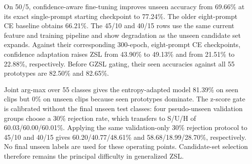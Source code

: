 \documentclass[conference]{IEEEtran}
\begin{document}
\begin{table}[t]
\centering
\caption{Zero-shot action recognition in prior publications and our ETRI
evaluation. Datasets and class draws differ across rows, so the numbers
provide context rather than a direct ranking.}
\label{tab:context}
\scriptsize
{}
\end{table}

On 50/5, confidence-aware fine-tuning improves unseen accuracy from 69.66\% at
its exact single-prompt starting checkpoint to 77.24\%. The older eight-prompt
CE baseline obtains 66.21\%. The 45/10 and 40/15 rows use the same current
feature and training pipeline and show degradation as the unseen candidate set
expands. Against their corresponding 300-epoch, eight-prompt CE checkpoints,
confidence adaptation raises ZSL from 43.90\% to 49.13\% and from 21.51\% to
22.88\%, respectively. Before GZSL gating, their seen accuracies against all 55
prototypes are 82.50\% and 82.65\%.

Joint arg-max over 55 classes gives the entropy-adapted model 81.39\% on seen clips but
0\% on unseen clips because seen prototypes dominate. The z-score gate is
calibrated without the final unseen test classes: four pseudo-unseen validation
groups choose a 30\% rejection rate, which transfers to S/U/H of
60.03/60.00/60.01\%. Applying the same validation-only 30\% rejection protocol
to 45/10 and 40/15 gives 60.20/40.77/48.61\% and 58.68/18.99/28.70\%,
respectively. No final unseen labels are used for these operating points.
Candidate-set selection therefore remains the principal difficulty in
generalized ZSL.
\end{document}
